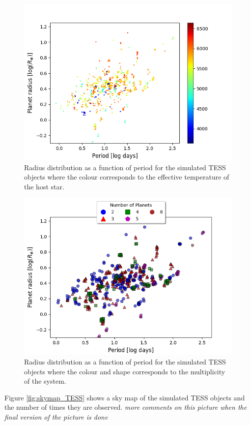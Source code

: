 \documentclass[12pt]{report}
\begin{document}
\begin{figure}[h!]
 	 \centering
 	 \includegraphics[width=\textwidth]{img/R_P-plot_effTemp_cut-off.png}
 	 \caption{Radius distribution as a function of period for the simulated TESS objects where the colour corresponds to the effective temperature of the host star.}
 	 \label{fig:RP_plot_temp}
\end{figure}
\begin{figure}
 	 \centering
 	 \includegraphics[width=\textwidth]{img/R_P-plot_numP1.png}
 	 \caption{Radius distribution as a function of period for the simulated TESS objects where the colour and shape corresponds to the multiplicity of the system.}
 	 \label{fig:RP_plot_multi}
\end{figure}
	\newpage Figure \ref{fig:skymap_TESS} shows a sky map of the simulated TESS objects and the number of times they are observed. \textit{more comments on this picture when the final version of the picture is done}
\end{document}
